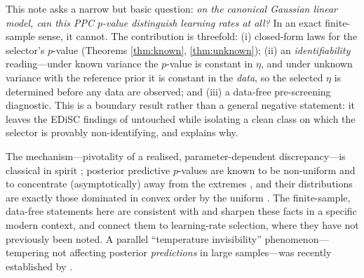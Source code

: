 \documentclass[11pt]{article}
\theoremstyle{remark}
\begin{document}
This note asks a narrow but basic question: \emph{on the canonical Gaussian linear model, can this PPC $p$-value
distinguish learning rates at all?} In an exact finite-sample sense, it cannot. The contribution is
threefold: (i) closed-form laws for the selector's $p$-value (Theorems
\ref{thm:known}, \ref{thm:unknown}); (ii) an \emph{identifiability} reading---under known variance the $p$-value
is constant in $\eta$, and under unknown variance with the reference prior it is constant in the \emph{data}, so
the selected $\eta$ is determined before any data are observed; and (iii) a data-free pre-screening diagnostic.
This is a boundary result rather than a general negative statement: it leaves the EDiSC findings of
\citet{zafar2024} untouched while isolating a clean class on which the selector is provably non-identifying, and
explains why.

The mechanism---pivotality of a realised, parameter-dependent discrepancy---is classical in spirit
\citep{meng1994,gelman1996}; posterior predictive $p$-values are known to be non-uniform and to concentrate
(asymptotically) away from the extremes \citep{robins2000}, and their distributions are exactly those dominated
in convex order by the uniform \citep{rdl2015}. The finite-sample, data-free statements here are consistent with and
sharpen these facts in a specific modern context, and connect them to learning-rate selection, where they have
not previously been noted. A parallel ``temperature invisibility'' phenomenon---tempering not affecting posterior
\emph{predictions} in large samples---was recently established by \citet{mclatchie2024}.
\end{document}
